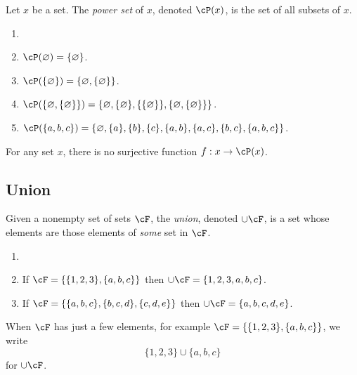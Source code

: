 \documentclass{amsart}
\begin{document}
\begin{defn}
  Let $x$ be a set.
  The \emph{power set} of $x$, denoted $\cP(x)$, is the set of all subsets of $x$.
\end{defn}


\begin{eg}\label{eg:subsets}
  \begin{enumerate}
  \item[]
  \item $\cP(\varnothing) = \{\varnothing\}$.
  \item $\cP(\{ \varnothing \}) = \{\varnothing, \{\varnothing\}\}$.
  \item $\cP(\{\varnothing, \{\varnothing\}\}) = \{ \varnothing, \{\varnothing\}, \{\{\varnothing\}\}, \{\varnothing, \{\varnothing\}\} \}$.
  \item $\cP(\{ a,b,c \}) = \{ \varnothing, \{ a \}, \{ b \}, \{ c \}, \{ a,b \}, \{ a,c \}, \{ b,c \}, \{ a,b,c \} \}$.
  \end{enumerate}
\end{eg}

\begin{thm}
  For any set $x$, there is no surjective function $f : x \to \cP(x)$.
\end{thm}

\subsection{Union}
\label{sec:union}

\begin{defn}
  Given a nonempty set of sets $\cF$, the \emph{union}, denoted $\cup\cF$, is a set whose elements are those elements of \emph{some} set in $\cF$.
\end{defn}

\begin{eg}
  \begin{enumerate}
  \item[]
  \item If $\cF = \{\{1,2,3\},\{a,b,c\}\}$ then $\cup\cF = \{1,2,3,a,b,c\}$.
  \item If $\cF = \{\{a,b,c\},\{b,c,d\},\{c,d,e\}\}$ then $\cup\cF = \{a,b,c,d,e\}$.
  \end{enumerate}
\end{eg}

\begin{notn}
  When $\cF$ has just a few elements, for example $\cF = \{\{1,2,3\},\{a,b,c\}\}$, we write
  \[
    \{1,2,3\} \cup \{a,b,c\}
  \]
  for $\cup\cF$.
\end{notn}
\end{document}
